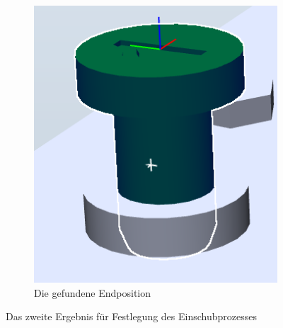 \documentclass[14pt,a4paper,titlepage]{article}
\begin{document}
\begin{figure}[t!]
\begin{subfigure}{0.3\linewidth}
				\includegraphics[width=\linewidth]{result4.png}
				\caption{Die gefundene Endposition}
			\end{subfigure}
			\caption{Das zweite Ergebnis für Festlegung des Einschubprozesses}
		\end{figure}
\end{document}
